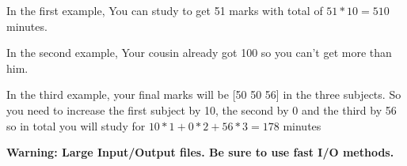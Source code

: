 In the first example, You can study to get 51 marks with total of $51*10 = 510$ minutes.

In the second example, Your cousin already got 100 so you can't get more than him.

In the third example, your final marks will be [50 50 56] in the three subjects. So you need to increase the first subject by 10, the second by 0 and the third by 56 so in total you will study for $10*1+0*2+56*3=178$ minutes

\textbf{Warning: Large Input/Output files. Be sure to use fast I/O methods.}